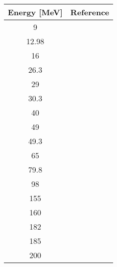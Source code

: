 \begin{tabular}{|c||c|} 
    \hline 
    \bf{Energy [MeV]} & \bf{Reference} \\
    \hline
    \hline 
    9 & \cite{Kretschmer79}\\
    12.98 & \cite{Rathmell72}\\
    16 & \cite{VarnerPhDThesis}\\
    26.3 & \cite{VanOers74, Watson67}\\
    29 & \cite{Craig64}\\
    30.3 & \cite{VanOers74, Greenlees70}\\
    40 & \cite{Blumberg66}\\
    49 & \cite{Craig66}\\
    49.3 & \cite{Mani71}\\
    65 & \cite{Sakaguchi82}\\
    79.8 & \cite{Schwandt82}\\
    98 & \cite{Schwandt82}\\
    155 & \cite{Willis68}\\
    160 & \cite{Nadasen81, Schwandt82}\\
    182 & \cite{Nadasen81, Schwandt82}\\
    185 & \cite{VanOers74}\\
    200 & \cite{Lee88}\\
    \hline
\end{tabular}
